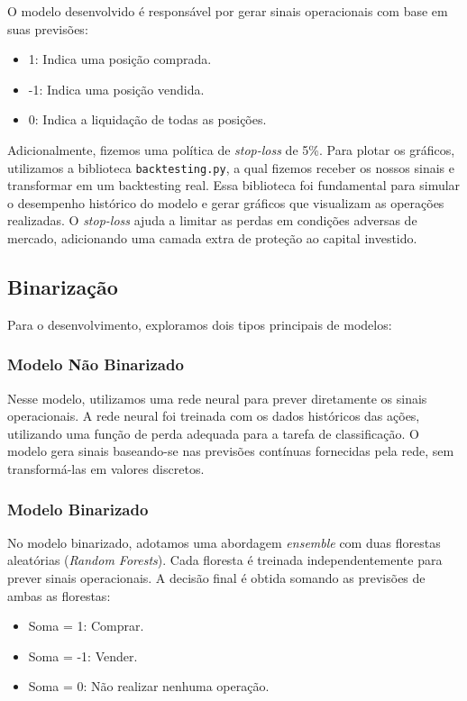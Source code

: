 \documentclass{article}
\begin{document}
O modelo desenvolvido é responsável por gerar sinais operacionais com base em suas previsões:
\begin{itemize}
    \item 1: Indica uma posição comprada.
    \item -1: Indica uma posição vendida.
    \item 0: Indica a liquidação de todas as posições.
\end{itemize}

Adicionalmente, fizemos uma política de \textit{stop-loss} de 5\%. Para plotar os gráficos, utilizamos a biblioteca \texttt{backtesting.py}, a qual fizemos receber os nossos sinais e transformar em um backtesting real. Essa biblioteca foi fundamental para simular o desempenho histórico do modelo e gerar gráficos que visualizam as operações realizadas. O \textit{stop-loss} ajuda a limitar as perdas em condições adversas de mercado, adicionando uma camada extra de proteção ao capital investido.

\subsection{Binarização}

Para o desenvolvimento, exploramos dois tipos principais de modelos:

\subsubsection{Modelo Não Binarizado}

Nesse modelo, utilizamos uma rede neural para prever diretamente os sinais operacionais. A rede neural foi treinada com os dados históricos das ações, utilizando uma função de perda adequada para a tarefa de classificação. O modelo gera sinais baseando-se nas previsões contínuas fornecidas pela rede, sem transformá-las em valores discretos.

\subsubsection{Modelo Binarizado}

No modelo binarizado, adotamos uma abordagem \textit{ensemble} com duas florestas aleatórias (\textit{Random Forests}). Cada floresta é treinada independentemente para prever sinais operacionais. A decisão final é obtida somando as previsões de ambas as florestas:
\begin{itemize}
    \item Soma = 1: Comprar.
    \item Soma = -1: Vender.
    \item Soma = 0: Não realizar nenhuma operação.
\end{itemize}
\end{document}
